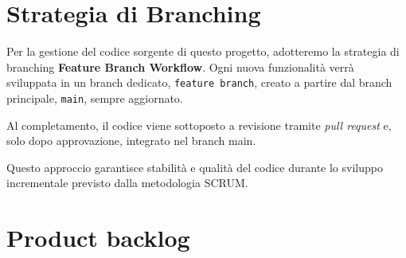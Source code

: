 \section*{Strategia di Branching}

Per la gestione del codice sorgente di questo progetto, adotteremo la strategia di branching \textbf{Feature Branch Workflow}.
Ogni nuova funzionalità verrà sviluppata in un branch dedicato, \verb|feature branch|, creato a partire dal branch principale, \verb|main|, sempre aggiornato.

Al completamento, il codice viene sottoposto a revisione tramite \textit{pull request} e, solo dopo approvazione, integrato nel branch main.

Questo approccio garantisce stabilità e qualità del codice durante lo sviluppo incrementale previsto dalla metodologia SCRUM.

\section*{Product backlog}

\vspace{-1cm}

